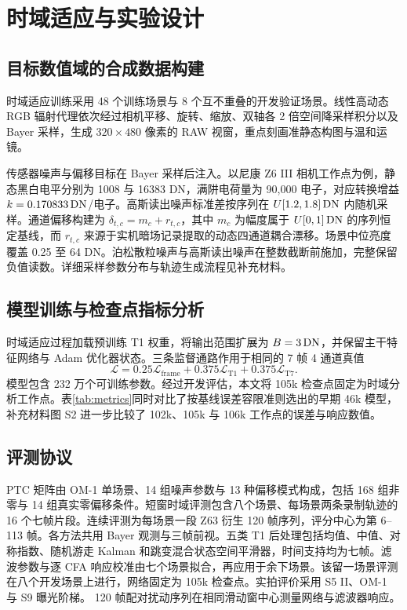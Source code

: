 \section{时域适应与实验设计}
\label{sec:adapt}

\subsection{目标数值域的合成数据构建}
时域适应训练采用 48 个训练场景与 8 个互不重叠的开发验证场景。线性高动态 RGB 辐射代理依次经过相机平移、旋转、缩放、双轴各 2 倍空间降采样积分以及 Bayer 采样，生成 $320\times480$ 像素的 RAW 视窗，重点刻画准静态构图与温和运镜。

传感器噪声与偏移目标在 Bayer 采样后注入。以尼康 Z6 III 相机工作点为例，静态黑白电平分别为 1008 与 16383 DN，满阱电荷量为 90,000 电子，对应转换增益 $k=0.170833\,\mathrm{DN}$/电子。高斯读出噪声标准差按序列在 $U[1.2,1.8]\,\mathrm{DN}$ 内随机采样。通道偏移构建为 $\delta_{t,c}=m_c+r_{t,c}$，其中 $m_c$ 为幅度属于 $U[0,1]\,\mathrm{DN}$ 的序列恒定基线，而 $r_{t,c}$ 来源于实机暗场记录提取的动态四通道耦合漂移。场景中位亮度覆盖 0.25 至 64 DN。泊松散粒噪声与高斯读出噪声在整数截断前施加，完整保留负值读数。详细采样参数分布与轨迹生成流程见补充材料。

\subsection{模型训练与检查点指标分析}
时域适应过程加载预训练 T1 权重，将输出范围扩展为 $B=3\,\mathrm{DN}$，并保留主干特征网络与 Adam 优化器状态。三条监督通路作用于相同的 7 帧 4 通道真值
\begin{equation}
 \mathcal L=0.25\mathcal L_{\mathrm{frame}}
          +0.375\mathcal L_{\mathrm{T1}}
          +0.375\mathcal L_{\mathrm{T7}}.
 \label{eq:training}
\end{equation}
模型包含 232 万个可训练参数。经过开发评估，本文将 105k 检查点固定为时域分析工作点。表\ref{tab:metrics}同时对比了按基线误差容限准则选出的早期 46k 模型，补充材料图 S2 进一步比较了 102k、105k 与 106k 工作点的误差与响应数值。


\subsection{评测协议}
PTC 矩阵由 OM-1 单场景、14 组噪声参数与 13 种偏移模式构成，包括 168 组非零与 14 组真实零偏移条件。短窗时域评测包含八个场景、每场景两条录制轨迹的 16 个七帧片段。连续评测为每场景一段 Z63 衍生 120 帧序列，评分中心为第 6--113 帧。各方法共用 Bayer 观测与三帧前视。五类 T1 后处理包括均值、中值、对称指数、随机游走 Kalman 和跳变混合状态空间平滑器，时间支持均为七帧。滤波参数与逐 CFA 响应校准由七个场景拟合，再应用于余下场景。该留一场景评测在八个开发场景上进行，网络固定为 105k 检查点。实拍评价采用 S5 II、OM-1 与 S9 曝光阶梯。 120 帧配对扰动序列在相同滑动窗中心测量网络与滤波器响应。

